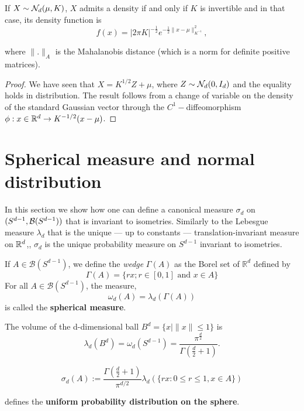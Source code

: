 \documentclass{article}
\begin{document}
\begin{prop}
  If $X \sim \mathcal{N}_d(\mu,K)$, $X$ admits a density if and only if $K$ is
  invertible and in that case, its density function is
  $$f(x)=|2 \pi K|^{-\frac{1}{2}} e^{-\frac{1}{2}\|x - \mu\|_{K^{-1}}^{2}},$$

 where $\|.\|_A$ is the Mahalanobis distance (which is a norm for  definite positive matrices).
\end{prop}



\begin{proof}
  We have seen that $X = K^{1/2}Z + \mu$, where $Z \sim \mathcal{N}_d(0,I_d)$ and the equality holds in
  distribution. The result follows from a change of variable on the density of the
  standard Gaussian vector through the $C^1-$diffeomorphism $\phi:
  x \in \mathbb{R}^{d} \to K^{-1/2}(x - \mu)$.
\end{proof}

\section{Spherical measure and normal distribution}

In this section we show how one can define a canonical measure $\sigma_d$ on
$(S^{d-1},\mathcal{B}(S^{d-1}))$ that is invariant to isometries. Similarly to the
Lebesgue measure $\lambda_d$ that is the unique --- up to constants ---
translation-invariant measure on $\mathbb{R}^{d}$,, $\sigma_d$ is the unique probability measure on $S^{d-1}$ invariant to isometries.

\begin{definition}
  If $A \in \mathcal{B}\left(S^{d-1}\right)$, we define the \emph{wedge}
  $\Gamma(A)$ as the Borel set
  of $\mathbb{R}^{d}$ defined by
  $$
  \Gamma(A)=\{r x ; r \in[0,1] \text { and } x \in A\}
  $$
  For all $A \in \mathcal{B}\left(S^{d-1}\right)$, the measure,
  $$
  \omega_{d}(A)= \lambda_{d}(\Gamma(A))
  $$
  is called the \textbf{spherical measure}. 
\end{definition}

\begin{prop}
  The volume of the d-dimensional ball $B^d = \{x \mid \|x\| \leq 1\} $ is
  $$ \lambda_d(B^d) = \omega_d(S^{d-1}) =  \frac{\pi^{\frac{d}{2}}}{\Gamma\left(\frac{d}{2}+1\right)}.$$
\end{prop}

\begin{definition}

  \begin{equation}
    \sigma_{d}(A):=\frac{\Gamma\left(\frac{d}{2}+1\right)}{\pi^{d / 2}} \lambda_{d}(\{r x: 0 \leq r \leq 1, x \in A\})
  \end{equation}

  defines the \textbf{uniform probability distribution on the sphere}.
  
\end{definition}
\end{document}

